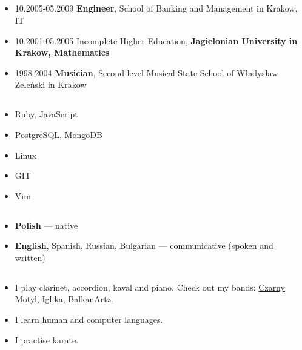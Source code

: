 \documentclass[a4paper]{article}
\begin{document}
\subsection*{}
\begin{itemize}
  \item
    10.2005-05.2009 \textbf{Engineer}, School of Banking and Management in Krakow, IT

  \item
    10.2001-05.2005 Incomplete Higher Education,
    \textbf{Jagielonian University in Krakow, Mathematics}

  \item
    1998-2004 \textbf{Musician},
    Second level Musical State School of Władysław Żeleński in Krakow
\end{itemize}

\subsection*{}
\begin{itemize}
\item
  Ruby, JavaScript
\item
  PostgreSQL, MongoDB
\item
  Linux
\item
  GIT
\item
  Vim
\end{itemize}

\subsection*{}
\begin{itemize}
\item
  \textbf{Polish} --- native
\item
  \textbf{English}, Spanish, Russian, Bulgarian --- communicative (spoken and written)
\end{itemize}

\subsection*{}
\begin{itemize}
\item
	I play clarinet, accordion, kaval and piano. Check out my bands: \href{https://soundcloud.com/czarny-motyl}{Czarny Motyl}, \href{https://soundcloud.com/iglika-pl}{Iglika}, \href{https://soundcloud.com/user-919481466}{BalkanArtz}.
\item
  I learn human and computer languages.
\item
  I practise karate.
\end{itemize}
\end{document}
